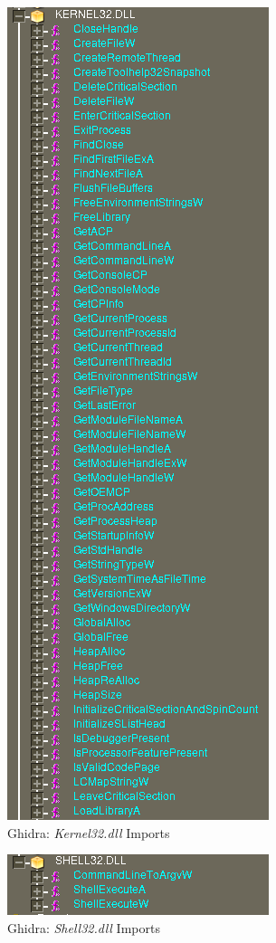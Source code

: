 \documentclass[10pt,a4paper]{article}
\begin{document}
\begin{figure}[!htbp]%
	\centering
	\includegraphics[width=\columnwidth]{pics/importsKernel32.png}
	\caption{Ghidra: \textit{Kernel32.dll} Imports}
	\label{importsKernel32}
\end{figure}

\begin{figure}[!htbp]%
	\centering
	\includegraphics[width=\columnwidth]{pics/importsShell32.png}
	\caption{Ghidra: \textit{Shell32.dll} Imports}
	\label{importsShell32}
\end{figure}

\newpage
\printbibliography
\end{document}
